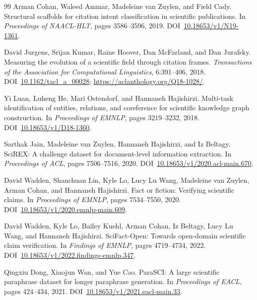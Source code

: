 \begin{thebibliography}{99}
Arman Cohan, Waleed Ammar, Madeleine van Zuylen, and Field Cady.
\newblock Structural scaffolds for citation intent classification in scientific publications.
\newblock In \emph{Proceedings of NAACL-HLT}, pages 3586--3596, 2019.
\newblock DOI~\href{https://doi.org/10.18653/v1/N19-1361}{10.18653/v1/N19-1361}.

David Jurgens, Srijan Kumar, Raine Hoover, Dan McFarland, and Dan Jurafsky.
\newblock Measuring the evolution of a scientific field through citation frames.
\newblock \emph{Transactions of the Association for Computational Linguistics}, 6:391--406, 2018.
\newblock DOI~\href{https://doi.org/10.1162/tacl_a_00028}{10.1162/tacl\_a\_00028}; \url{https://aclanthology.org/Q18-1028/}.

Yi Luan, Luheng He, Mari Ostendorf, and Hannaneh Hajishirzi.
\newblock Multi-task identification of entities, relations, and coreference for scientific knowledge graph construction.
\newblock In \emph{Proceedings of EMNLP}, pages 3219--3232, 2018.
\newblock DOI~\href{https://doi.org/10.18653/v1/D18-1360}{10.18653/v1/D18-1360}.

Sarthak Jain, Madeleine van Zuylen, Hannaneh Hajishirzi, and Iz Beltagy.
\newblock SciREX: A challenge dataset for document-level information extraction.
\newblock In \emph{Proceedings of ACL}, pages 7506--7516, 2020.
\newblock DOI~\href{https://doi.org/10.18653/v1/2020.acl-main.670}{10.18653/v1/2020.acl-main.670}.

David Wadden, Shanchuan Lin, Kyle Lo, Lucy Lu Wang, Madeleine van Zuylen, Arman Cohan, and Hannaneh Hajishirzi.
\newblock Fact or fiction: Verifying scientific claims.
\newblock In \emph{Proceedings of EMNLP}, pages 7534--7550, 2020.
\newblock DOI~\href{https://doi.org/10.18653/v1/2020.emnlp-main.609}{10.18653/v1/2020.emnlp-main.609}.

David Wadden, Kyle Lo, Bailey Kuehl, Arman Cohan, Iz Beltagy, Lucy Lu Wang, and Hannaneh Hajishirzi.
\newblock SciFact-Open: Towards open-domain scientific claim verification.
\newblock In \emph{Findings of EMNLP}, pages 4719--4734, 2022.
\newblock DOI~\href{https://doi.org/10.18653/v1/2022.findings-emnlp.347}{10.18653/v1/2022.findings-emnlp.347}.

Qingxiu Dong, Xiaojun Wan, and Yue Cao.
\newblock ParaSCI: A large scientific paraphrase dataset for longer paraphrase generation.
\newblock In \emph{Proceedings of EACL}, pages 424--434, 2021.
\newblock DOI~\href{https://doi.org/10.18653/v1/2021.eacl-main.33}{10.18653/v1/2021.eacl-main.33}.


\end{thebibliography}

